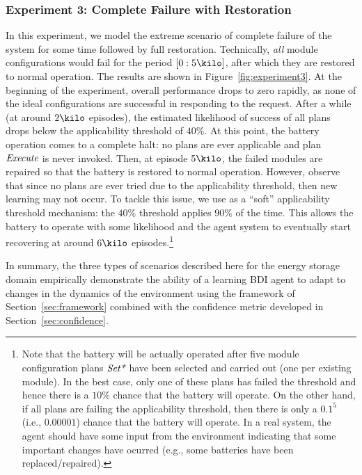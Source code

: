 %

\subsubsection{Experiment 3: Complete Failure with Restoration}

In this experiment, we model the extreme scenario of complete failure of the system for some time followed by full restoration. 
Technically, \emph{all} module configurations would fail for the period $[0:5\kilo]$, after which they are restored to normal operation.  
The results are shown in Figure~\ref{fig:experiment3}. 
At the beginning of the experiment, overall performance drops to zero rapidly, as none of the ideal configurations are successful in responding to the request. After a while (at around $2\kilo$ episodes), the estimated likelihood of success of all plans drops below the applicability threshold of $40\%$. At this point, the battery operation comes to a complete halt: no plans are ever applicable and plan $\operatorname{\textit{Execute}}$ is never invoked. 
Then, at episode $5\kilo$, the failed modules are repaired so that the battery is restored to normal operation. However, observe that since no plans are ever tried due to the applicability threshold, then new learning may not occur. To tackle this issue, we use as a ``soft'' applicability threshold mechanism: the $40\%$ threshold applies $90\%$ of the time. This allows the battery to operate with some likelihood and the agent system to eventually start recovering at around $6\kilo$ episodes.\footnote{Note that the battery will be actually operated after five module configuration plans $\operatorname{\textit{Set*}}$ have been selected and carried out (one per existing module). In the best case, only one of these plans has failed the threshold and hence there is a $10\%$ chance that the battery will operate. On the other hand, if all plans are failing the applicability threshold, then there is only a $0.1^5$ (i.e.,  $0.00001$) chance that the battery will operate. In a real system, the agent should have some input from the environment indicating that some important changes have ocurred (e.g., some batteries have been replaced/repaired).}


In summary, the three types of scenarios described here for the energy storage domain empirically demonstrate the ability of a learning BDI agent to adapt to changes in the dynamics of the environment using the framework of Section~\ref{sec:framework} combined with the confidence metric developed in Section~\ref{sec:confidence}.  



 

